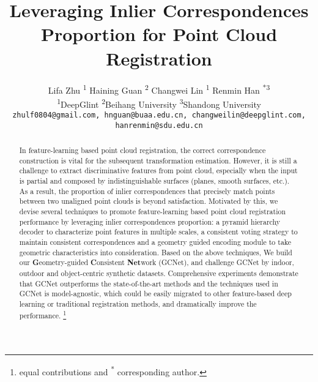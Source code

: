 \documentclass[10pt,twocolumn,letterpaper]{article}
\newcommand*{\affaddr}[1]{#1}
\newcommand*{\affmark}[1][*]{\textsuperscript{#1}}
\renewcommand\thefootnote{}
\begin{document}
\title{Leveraging Inlier Correspondences Proportion for Point Cloud Registration}



\author{
Lifa Zhu \textsuperscript{}\affmark[1] \qquad Haining Guan \textsuperscript{}\affmark[2] \qquad Changwei Lin \affmark[1] \qquad Renmin Han \textsuperscript{*}\affmark[3]\\
\affaddr{\affmark[1]DeepGlint} \qquad
\affaddr{\affmark[2]Beihang University} \qquad \affaddr{\affmark[3]Shandong University} \\
{\tt\small zhulf0804@gmail.com, hnguan@buaa.edu.cn, changweilin@deepglint.com, hanrenmin@sdu.edu.cn} 
}

\maketitle

\begin{abstract}
\vspace{-.5em}
In feature-learning based point cloud registration, the correct correspondence construction is vital for the subsequent transformation estimation. However, it is still a challenge to extract discriminative features from point cloud, especially when the input is partial and composed by indistinguishable surfaces (planes, smooth surfaces, etc.). As a result, the proportion of inlier correspondences that precisely match points between two unaligned point clouds is beyond satisfaction. Motivated by this, we devise several techniques to promote feature-learning based point cloud registration performance by leveraging inlier correspondences proportion: a pyramid hierarchy decoder to characterize point features in multiple scales, a consistent voting strategy to maintain consistent correspondences and a geometry guided encoding module to take geometric characteristics into consideration.
Based on the above techniques, We build our \textbf{G}eometry-guided \textbf{C}onsistent \textbf{Net}work (GCNet), and 
challenge GCNet by indoor, outdoor and object-centric synthetic datasets. Comprehensive experiments demonstrate that GCNet outperforms the state-of-the-art methods and the techniques used in GCNet is model-agnostic, which could be easily migrated to other feature-based deep learning or traditional registration methods, and dramatically improve the performance. 
\footnote{\textsuperscript{} equal contributions and \textsuperscript{*} corresponding author.}
   \setcounter{footnote}{0}
   \renewcommand\thefootnote{\arabic{footnote}}
\end{abstract}
\end{document}
